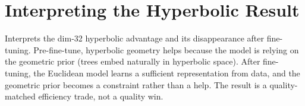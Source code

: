 \section{Interpreting the Hyperbolic Result}
\label{sec_disc_hyperbolic}

Interprets the dim-32 hyperbolic advantage and its disappearance after fine-tuning. Pre-fine-tune, hyperbolic geometry helps because the model is relying on the geometric prior (trees embed naturally in hyperbolic space). After fine-tuning, the Euclidean model learns a sufficient representation from data, and the geometric prior becomes a constraint rather than a help. The result is a quality-matched efficiency trade, not a quality win.
